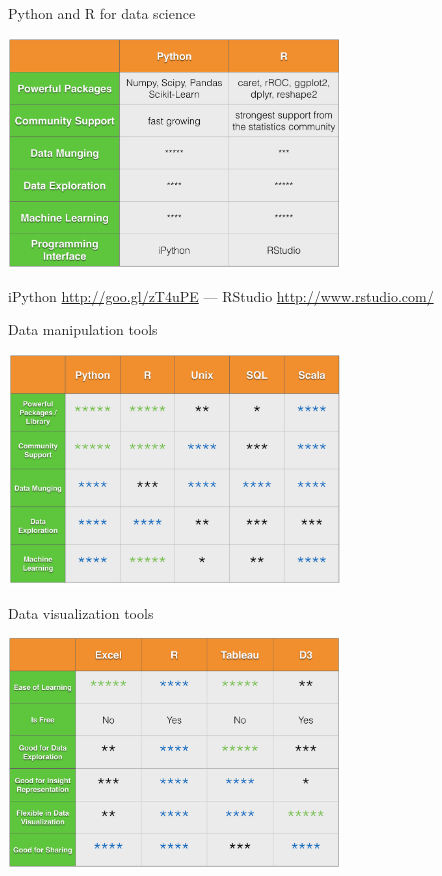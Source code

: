 \documentclass[10pt]{beamer}
\begin{document}
    \begin{frame}{Python and R for data science}
      \begin{center}
        \includegraphics[width=250pt]{graphs/python_r}
      \end{center}
      {\footnotesize
        iPython \url{http://goo.gl/zT4uPE}
        --- 
        RStudio \url{http://www.rstudio.com/}
      }
    \end{frame}

    \begin{frame}{Data manipulation tools}
      \begin{center}
         \includegraphics[width=250pt]{graphs/data_tools}
      \end{center}
    \end{frame}

    \begin{frame}{Data visualization tools}
      \begin{center}
         \includegraphics[width=250pt]{graphs/data_visualization_tools}
      \end{center}
    \end{frame}
  
\end{document}
